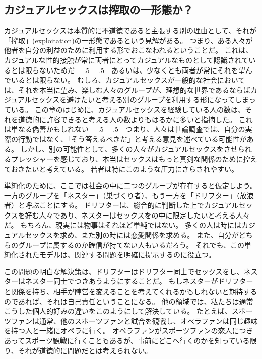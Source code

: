 \documentclass[paper=a4,book,openany]{jlreq}
\def\DDASH{―\kern-.5\zw―\kern-.5\zw―}
\begin{document}
\subsection{カジュアルセックスは搾取の一形態か？}

カジュアルセックスは本質的に不道徳であると主張する別の理由として、それが「搾取」(exploitation)の一形態であるという見解がある。
つまり、ある人々が他者を自分の利益のために利用する形でおこなわれるということだ。
これは、カジュアルな性的接触が常に両者にとってカジュアルなものとして認識されているとは限らないためだ{\DDASH}あるいは、少なくとも両者が常にそれを望んでいるとは限らない。
むしろ、カジュアルセックスが一般的な社会においては、それを本当に望み、楽しむ人々のグループが、理想的な世界であるならばカジュアルセックスを避けたいと考える別のグループを利用する形になってしまっている。
この章のはじめに、カジュアルセックスを経験している人の数は、それを道徳的に許容できると考える人の数よりもはるかに多いと指摘した。
これは単なる偽善かもしれない{\DDASH}つまり、人々は世論調査では、自分の実際の行動ではなく、「そう答えるべきだ」と考える意見を述べている可能性がある。
しかし、別の可能性として、多くの人々がカジュアルセックスをさせられるプレッシャーを感じており、本当はセックスはもっと真剣な関係のために控えておきたいと考えている。
若者は特にこのような圧力にさらされやすい。

単純化のために、ここでは社会の中に二つのグループが存在すると仮定しよう。
一方のグループを「ネスター」（巣づくり者）、もう一方を「ドリフター」（放浪者）と呼ぶことにする。
ドリフターは、総合的に判断した上でカジュアルセックスを好む人々であり、ネスターはセックスをの中に限定したいと考える人々だ。
もちろん、現実には物事はそれほど単純ではない。
多くの人は時にはカジュアルセックスを求め、また別の時には恋愛関係を求める。
また、自分がどちらのグループに属するのか確信が持てない人もいるだろう。
それでも、この単純化されたモデルは、関連する問題を明確に提示するのに役立つ。

この問題の明白な解決策は、ドリフターはドリフター同士でセックスをし、ネスターはネスター同士でつきあうようにすることだ。
もしネスターがドリフターと関係を持ち、相手が陣営を変えることを考えてくれるかもしれないと期待するのであれば、それは自己責任ということになる。
他の領域では、私たちは通常こうした個人的好みの違いをこのようにして解決している。
たとえば、スポーツファンは通常、他のスポーツファンと試合を観戦し、オペラファンは同じ趣味を持つ人と一緒にオペラに行く。
オペラファンがスポーツファンの恋人につきあってスポーツ観戦に行くこともあるが、事前にどこへ行くのかを知っている限り、それが道徳的に問題だとは考えられない。
\end{document}
